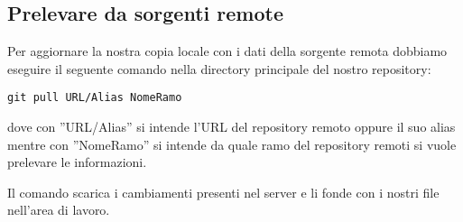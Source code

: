 \subsection{Prelevare da sorgenti remote}
Per aggiornare la nostra copia locale con i dati della sorgente remota dobbiamo eseguire il seguente comando nella directory principale del nostro repository:

\begin{center}
\texttt{git pull URL/Alias NomeRamo}
\end{center}

dove con ''URL/Alias'' si intende l'URL del repository remoto oppure il suo alias mentre con ''NomeRamo'' si intende da quale ramo del repository remoti si vuole prelevare le informazioni.

Il comando scarica i cambiamenti presenti nel server e li fonde con i nostri file nell'area di lavoro.
